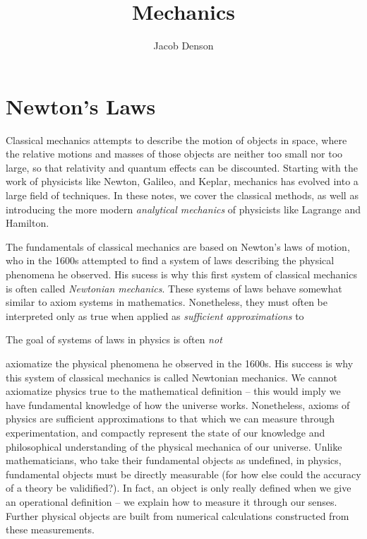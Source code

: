 

\title{Mechanics}
\author{Jacob Denson}




\maketitle



\chapter{Newton's Laws}

Classical mechanics attempts to describe the motion of objects in space, where the relative motions and masses of those objects are neither too small nor too large, so that relativity and quantum effects can be discounted. Starting with the work of physicists like Newton, Galileo, and Keplar, mechanics has evolved into a large field of techniques. In these notes, we cover the classical methods, as well as introducing the more modern \emph{analytical mechanics} of physicists like Lagrange and Hamilton.

The fundamentals of classical mechanics are based on Newton's laws of motion, who in the 1600s attempted to find a system of laws describing the physical phenomena he observed. His sucess is why this first system of classical mechanics is often called \emph{Newtonian mechanics}. These systems of laws behave somewhat similar to axiom systems in mathematics. Nonetheless, they must often be interpreted only as true when applied as \emph{sufficient approximations} to

The goal of systems of laws in physics is often \emph{not}

axiomatize the physical phenomena he observed in the 1600s. His success is why this system of classical mechanics is called Newtonian mechanics. We cannot axiomatize physics true to the mathematical definition -- this would imply we have fundamental knowledge of how the universe works. Nonetheless, axioms of physics are sufficient approximations to that which we can measure through experimentation, and compactly represent the state of our knowledge and philosophical understanding of the physical mechanica of our universe. Unlike mathematicians, who take their fundamental objects as undefined, in physics, fundamental objects must be directly measurable (for how else could the accuracy of a theory be validified?). In fact, an object is only really defined when we give an operational definition -- we explain how to measure it through our senses. Further physical objects are built from numerical calculations constructed from these measurements.

